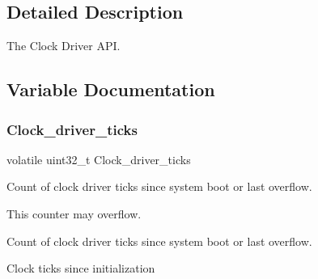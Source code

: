 \subsection{Detailed Description}
The Clock Driver A\+PI. 



\subsection{Variable Documentation}
\mbox{\label{group__RTEMSDriverClock_ga154adab6b69d3a14e921cfe8b2649d20}} 
\subsubsection{\texorpdfstring{Clock\_driver\_ticks}{Clock\_driver\_ticks}}
{\footnotesize\ttfamily volatile uint32\+\_\+t Clock\+\_\+driver\+\_\+ticks}



Count of clock driver ticks since system boot or last overflow. 

This counter may overflow.

Count of clock driver ticks since system boot or last overflow.

Clock ticks since initialization 